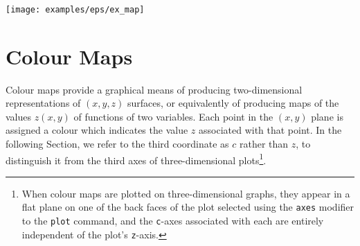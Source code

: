 {{}\\{\footnotesize
{}\newline
{}\newline
{}\newline
{}\newline
{}\newline
{}\newline
{}\newline
{}\newline
{}\newline
{}\newline
}\\{\footnotesize
{}\newline
{}\newline
}\\{\footnotesize
{}\newline
{}\newline
{}
}
\nlscf
\begin{center}
\texttt{[image: examples/eps/ex\_map]}
\end{center}
}

\section{Colour Maps}
\label{sec:colourmaps}

Colour maps provide a graphical means of producing two-dimensional
representations of $(x,y,z)$ surfaces, or equivalently of producing maps of the
values $z(x,y)$ of functions of two variables. Each point in the $(x,y)$ plane
is assigned a colour which indicates the value $z$ associated with that point.
In the following Section, we refer to the third coordinate as $c$ rather than
$z$, to distinguish it from the third axes of three-dimensional
plots\footnote{When colour maps are plotted on three-dimensional graphs, they
appear in a flat plane on one of the back faces of the plot selected using the
{\tt axes} modifier to the {\tt plot} command, and the {\tt c}-axes associated
with each are entirely independent of the plot's {\tt z}-axis.}.

